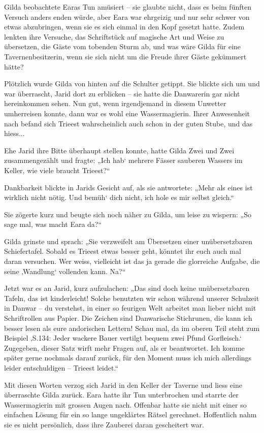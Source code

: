 Gilda beobachtete Earas Tun amüsiert – sie glaubte nicht, dass es beim fünften Versuch anders enden würde, aber Eara war ehrgeizig und nur sehr schwer von etwas abzubringen, wenn sie es sich einmal in den Kopf gesetzt hatte. Zudem lenkten ihre Versuche, das Schriftstück auf magische Art und Weise zu übersetzen, die Gäste vom tobenden Sturm ab, und was wäre Gilda für eine Tavernenbesitzerin, wenn sie sich nicht um die Freude ihrer Gäste gekümmert hätte?

Plötzlich wurde Gilda von hinten auf die Schulter getippt. Sie blickte sich um und war überrascht, Jarid dort zu erblicken – sie hatte die Danwarerin gar nicht hereinkommen sehen. Nun gut, wenn irgendjemand in diesem Unwetter umherreisen konnte, dann war es wohl eine Wassermagierin. Ihrer Anwesenheit nach befand sich Trieest wahrscheinlich auch schon in der guten Stube, und das hiess...

Ehe Jarid ihre Bitte überhaupt stellen konnte, hatte Gilda Zwei und Zwei zusammengezählt und fragte: „Ich hab‘ mehrere Fässer sauberen Wassers im Keller, wie viele braucht Trieest?“

Dankbarkeit blickte in Jarids Gesicht auf, als sie antwortete: „Mehr als eines ist wirklich nicht nötig. Und bemüh‘ dich nicht, ich hole es mir selbst gleich.“

Sie zögerte kurz und beugte sich noch näher zu Gilda, um leise zu wispern: „So sage mal, was macht Eara da?“

Gilda grinste und sprach: „Sie verzweifelt am Übersetzen einer unübersetzbaren Schiefertafel. Sobald es Trieest etwas besser geht, könntet ihr euch auch mal daran versuchen. Wer weiss, vielleicht ist das ja gerade die glorreiche Aufgabe, die seine ‚Wandlung‘ vollenden kann. Na?“

Jetzt war es an Jarid, kurz aufzulachen: „Das sind doch keine unübersetzbaren Tafeln, das ist kinderleicht! Solche benutzten wir schon während unserer Schulzeit in Danwar – du verstehst, in einer so feurigen Welt arbeitet man lieber nicht mit Schriftrollen aus Papier. Die Zeichen sind Danwarische Stichrunen, die kann ich besser lesen als eure andorischen Lettern! Schau mal, da im oberen Teil steht zum Beispiel ‚S.134: Jeder wackere Bauer vertilgt bequem zwei Pfund Gorfleisch.‘ Zugegeben, dieser Satz wirft mehr Fragen auf, als er beantwortet. Ich komme später gerne nochmals darauf zurück, für den Moment muss ich mich allerdings leider entschuldigen – Trieest leidet.“

Mit diesen Worten verzog sich Jarid in den Keller der Taverne und liess eine überraschte Gilda zurück. Eara hatte ihr Tun unterbrochen und starrte der Wassermagierin mit grossen Augen nach. Offenbar hatte sie nicht mit einer so einfachen Lösung für ein so lange ungeklärtes Rätsel gerechnet. Hoffentlich nahm sie es nicht persönlich, dass ihre Zauberei daran gescheitert war.

